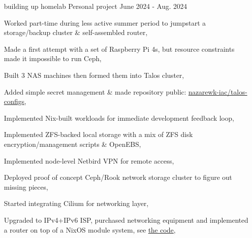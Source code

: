 \begin{cventries}
  \cventry
  {building up homelab} %
  {Personal project} %
  {} %
  {June 2024 - Aug. 2024} %
  {
    \begin{cvitems} %
      \item {Worked part-time during less active summer period to jumpstart a storage/backup cluster \& self-assembled router,}
      \item {Made a first attempt with a set of Raspberry Pi 4s, but resource constraints made it impossible to run Ceph,}
      \item {Built 3 NAS machines then formed them into Talos cluster,}
      \item {Added simple secret management \& made repository public: \href{https://github.com/nazarewk-iac/talos-configs}{nazarewk-iac/talos-configs},}
      \item {Implemented Nix-built workloads for immediate development feedback loop,}
      \item {Implemented ZFS-backed local storage with a mix of ZFS disk encryption/management scripts \& OpenEBS,}
      \item {Implemented node-level Netbird VPN for remote access,}
      \item {Deployed proof of concept Ceph/Rook network storage cluster to figure out missing pieces,}
      \item {Started integrating Cilium for networking layer,}
      \item {Upgraded to IPv4+IPv6 ISP, purchased networking equipment and implemented a router on top of a NixOS module system, see \href{https://github.com/nazarewk-iac/nix-configs/blob/9c4bee27ef4fa850334c60b9c4fc030773ea5220/modules/networking/router/README.md}{the code},}
    \end{cvitems}
  }


\end{cventries}
